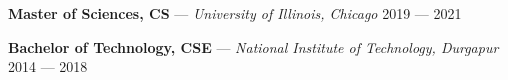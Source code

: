

\textbf{Master of Sciences, CS} --- \textit{University of Illinois, Chicago} \hfill 2019 --- 2021

\textbf{Bachelor of Technology, CSE} --- \textit{National Institute of Technology, Durgapur} \hfill 2014 --- 2018

